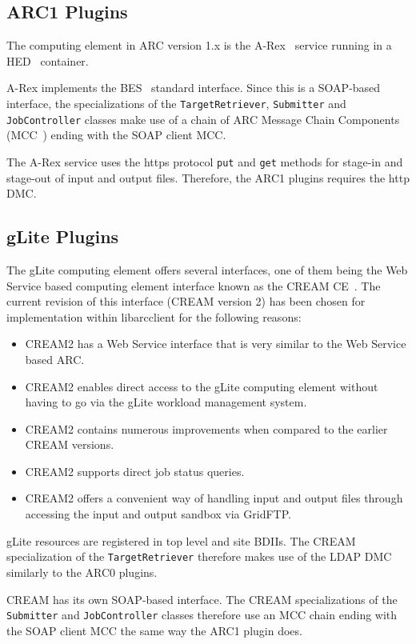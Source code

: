 \documentclass{book}
\newcommand{\libarcclient}{libarcclient}
\newcommand{\JobController}{\texttt{JobController}}
\newcommand{\TargetRetriever}{\texttt{TargetRetriever}}
\newcommand{\Submitter}{\texttt{Submitter}}
\begin{document}
\subsection{ARC1 Plugins}

The computing element in ARC version 1.x is the A-Rex~\cite{arex}
service running in a HED~\cite{hed} container.

A-Rex implements the BES~\cite{ogsa-bes} standard interface. Since
this is a SOAP-based~\cite{soap} interface, the specializations of the
{\TargetRetriever}, {\Submitter} and {\JobController} classes make use
of a chain of ARC Message Chain Components (MCC~\cite{hed}) ending
with the SOAP client MCC.

The A-Rex service uses the https protocol \texttt{put} and \texttt{get} methods for
stage-in and stage-out of input and output files. Therefore, the ARC1
plugins requires the http DMC.

\subsection{gLite Plugins}

The gLite computing element offers several interfaces, one of them
being the Web Service based computing element interface known as the
CREAM CE~\cite{cream}. The current revision of this interface (CREAM
version 2) has been chosen for implementation within {\libarcclient} for the
following reasons:

\begin{itemize}
\item CREAM2 has a Web Service interface that is very similar to the Web Service
  based ARC.
\item CREAM2 enables direct access to the gLite computing element
  without having to go via the gLite workload management system.
\item CREAM2 contains numerous improvements when compared to the
  earlier CREAM versions.
\item CREAM2 supports direct job status queries.
\item CREAM2 offers a convenient way of handling input and output
  files through accessing the input and output sandbox via GridFTP.
\end{itemize}

gLite resources are registered in top level and site BDIIs. The CREAM
specialization of the {\TargetRetriever} therefore makes use of the
LDAP DMC similarly to the ARC0 plugins.

CREAM has its own SOAP-based interface. The CREAM
specializations of the {\Submitter} and {\JobController} classes
therefore use an MCC chain ending with the SOAP client MCC the same 
way the ARC1 plugin does.
\end{document}
